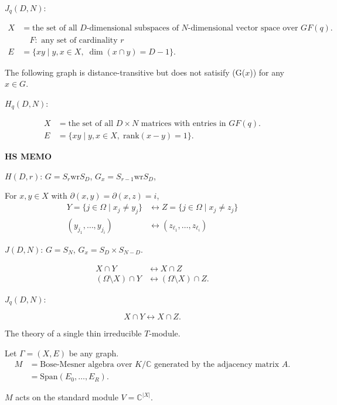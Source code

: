 \documentclass[
]{book}
\theoremstyle{definition}
\theoremstyle{definition}
\theoremstyle{definition}
\theoremstyle{definition}
\theoremstyle{remark}
\begin{document}
\(J_q(D, N)\):

\begin{align}
X & = \text{the set of all $D$-dimensional subspaces of $N$-dimensional vector space over $GF(q)$.}\\
& \quad F: \text{ any set of cardinality $r$}\\
E & = \{xy\mid y, x\in X, \; \dim (x\cap y) = D-1\}.
\end{align}

The following graph is distance-transitive but does not satisify (G(\(x\))) for any \(x\in G\).

\(H_q(D,N)\):

\begin{align}
X & = \text{the set of all $D\times N$ matrices with entries in $GF(q)$}.\\
E & = \{xy\mid y, x\in X, \; \mathrm{rank}(x-y) = 1\}.
\end{align}

\textbf{HS MEMO}

\(H(D,r)\): \(G = S_r \mathrm{wr} S_D\), \(G_x = S_{r-1} \mathrm{wr} S_D\),

For \(x, y\in X\) with \(\partial(x, y) = \partial(x,z) = i\),
\begin{align}
Y = \{j\in \Omega \mid x_j\neq y_j\} & \leftrightarrow Z = \{j\in \Omega \mid x_j\neq z_j\}\\
(y_{j_1}, \ldots, y_{j_i}) & \leftrightarrow (z_{\ell_1}, \ldots, z_{\ell_i})
\end{align}

\(J(D, N)\): \(G = S_N\), \(G_x = S_D \times S_{N-D}\).

\begin{align}
X\cap Y & \leftrightarrow X \cap Z\\
(\Omega \setminus X)\cap Y & \leftrightarrow (\Omega \setminus X)\cap Z.
\end{align}

\(J_q(D,N)\):

\[X\cap Y  \leftrightarrow X \cap Z.\]

The theory of a single thin irreducible \(T\)-module.

Let \(\Gamma = (X, E)\) be any graph.
\begin{align}
M & = \text{Bose-Mesner algebra over $K/\mathbb{C}$ generated by the adjacency matrix $A$.}\\
& = \mathrm{Span}(E_0, \ldots, E_R).
\end{align}

\(M\) acts on the standard module \(V = \mathbb{C}^{|X|}\).
\end{document}
